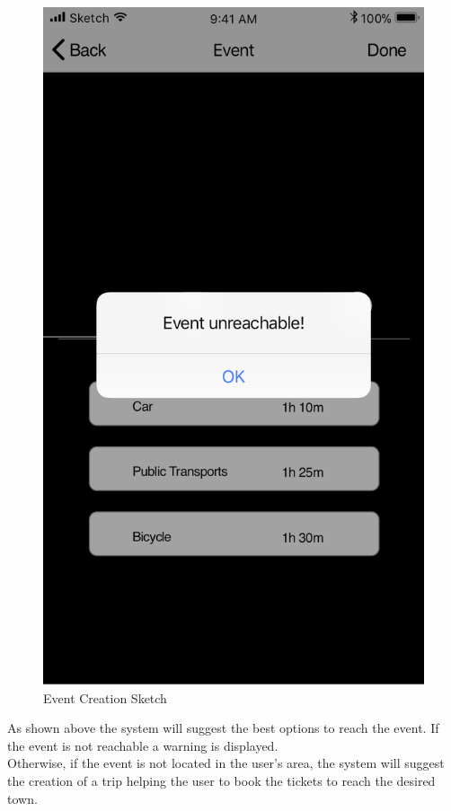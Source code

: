 \begin{enumerate}
\begin{figure}[H]
				\includegraphics[scale=0.25]{Images/Sketch/Event_Creation_3}
				\caption{Event Creation Sketch}
			\end{figure}
			As shown above the system will suggest the best options to reach the event. If the event is not reachable a warning is displayed.\\
			Otherwise, if the event is not located in the user’s area, the system will suggest the creation of a trip helping the user to book the tickets to reach the desired town.

\end{enumerate}
